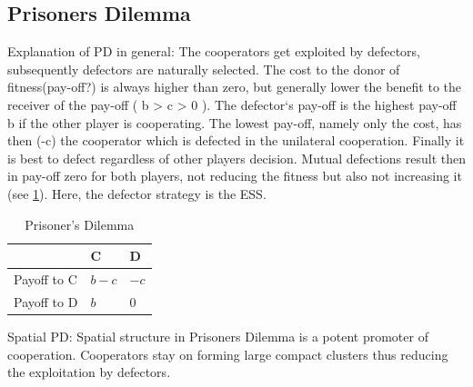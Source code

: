 \documentclass[DIV=calc, paper=a4, fontsize=11pt, twocolumn]{scrartcl}	 %
\begin{document}

\subsection*{Prisoners Dilemma}

Explanation of PD in general:
The cooperators get exploited by defectors, subsequently defectors are naturally selected. The cost to the donor of fitness(pay-off?) is always higher than zero, but generally lower the benefit to the receiver of the pay-off ( b > c > 0 ). The defector‘s pay-off is the highest pay-off b if the other player is cooperating. The lowest pay-off, namely only the cost, has then (-c) the cooperator which is defected in the unilateral cooperation. Finally it is best to defect regardless of other players decision. Mutual defections result then in pay-off zero for both players, not reducing the fitness but also not increasing it (see \ref{table1}). Here, the defector strategy is the ESS. 

\begin{table}[h]
\caption{Prisoner's Dilemma}
\label{table1}
\centering
\begin{tabular}{lll}
 & C & D \\
\midrule
Payoff to C & $b-c$ & $-c$ \\
Payoff to D & $b$ & $0$ \\
\bottomrule
\end{tabular}
\end{table}

Spatial PD: 
Spatial structure in Prisoners Dilemma is a potent promoter of cooperation. Cooperators stay on forming large compact clusters thus reducing the exploitation by defectors.
\end{document}
